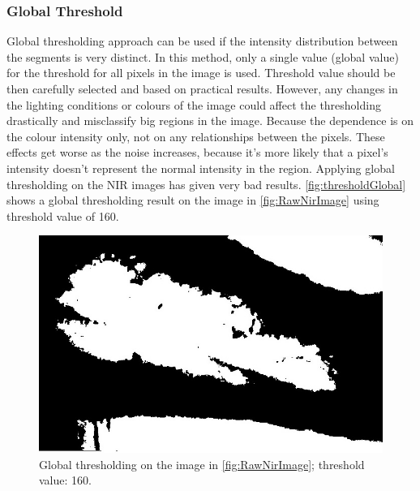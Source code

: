 \subsubsection{Global Threshold}
Global thresholding approach can be used if the intensity distribution between the segments is very distinct. In this method, only a single value (global value) for the threshold for all pixels in the image is used. Threshold value should be then carefully selected and based on practical results. However, any changes in the lighting conditions or colours of the image could affect the thresholding drastically and misclassify big regions in the image. Because the dependence is on the colour intensity only, not on any relationships between the pixels. These effects get worse as the noise increases, because it’s more likely that a pixel’s intensity doesn’t represent the normal intensity in the region. 
Applying global thresholding on the NIR images has given very bad results. \autoref{fig:thresholdGlobal} shows a global thresholding result on the image in \autoref{fig:RawNirImage} using threshold value of 160.

\begin{figure}[H]
\centering
\includegraphics[scale=0.6]{figures/thresholdGlobal.JPG}
\caption[Global thresholding example]{Global thresholding on the image in \autoref{fig:RawNirImage}; threshold value: 160.}\label{fig:thresholdGlobal}
\end{figure}

